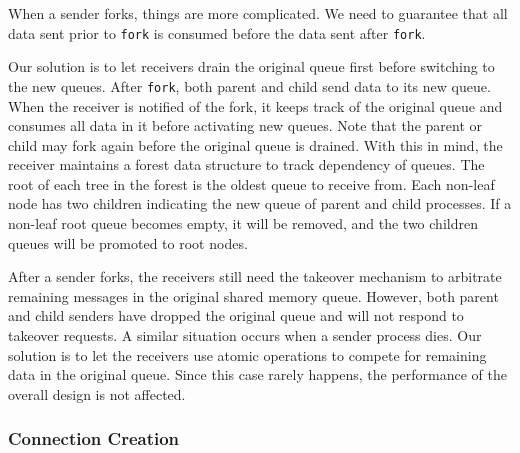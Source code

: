 When a sender forks, things are more complicated. We need to guarantee that all data sent prior to \texttt{fork} is consumed before the data sent after \texttt{fork}.

Our solution is to let receivers drain the original queue first before switching to the new queues. After \texttt{fork}, both parent and child send data to its new queue. When the receiver is notified of the fork, it keeps track of the original queue and consumes all data in it before activating new queues. Note that the parent or child may fork again before the original queue is drained. With this in mind, the receiver maintains a forest data structure to track dependency of queues. The root of each tree in the forest is the oldest queue to receive from. Each non-leaf node has two children indicating the new queue of parent and child processes. If a non-leaf root queue becomes empty, it will be removed, and the two children queues will be promoted to root nodes.

After a sender forks, the receivers still need the takeover mechanism to arbitrate remaining messages in the original shared memory queue. However, both parent and child senders have dropped the original queue and will not respond to takeover requests. A similar situation occurs when a sender process dies. Our solution is to let the receivers use atomic operations to compete for remaining data in the original queue. Since this case rarely happens, the performance of the overall design is not affected.



\subsubsection{Connection Creation}
\label{subsubsec:fork_new}

